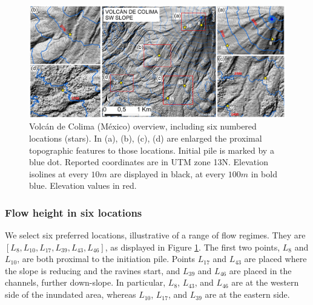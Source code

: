 \documentclass{article}
\begin{document}
\begin{figure}[H]
         \centering
        \includegraphics[width=1\textwidth]{figures/Colima/FigExtra.jpg}
        \caption{Volc{\'a}n de Colima (M{\'e}xico) overview, including six numbered locations (stars). In (a), (b), (c), (d) are enlarged the proximal topographic features to those locations. Initial pile is marked by a blue dot. Reported coordinates are in UTM zone 13N. Elevation isolines at every $10 m$ are displayed in black, at every $100m$ in bold blue. Elevation values in red.}
        \label{fig:Colima-extra}
\end{figure}

\subsubsection{Flow height in six locations}\label{Obs2}
We select six preferred locations, illustrative of a range of flow regimes. They are $[L_8, L_{10}, L_{17}, L_{39}, L_{43}, L_{46}]$, as displayed in Figure \ref{fig:Colima-extra}. The first two points, $L_8$ and $L_{10}$, are both proximal to the initiation pile. Points $L_{17}$ and $L_{43}$ are placed where the slope is reducing and the ravines start, and $L_{39}$ and $L_{46}$ are placed in the channels, further down-slope. In particular, $L_8$, $L_{43}$, and $L_{46}$ are at the western side of the inundated area, whereas $L_{10}$, $L_{17}$, and $L_{39}$ are at the eastern side.
\end{document}
